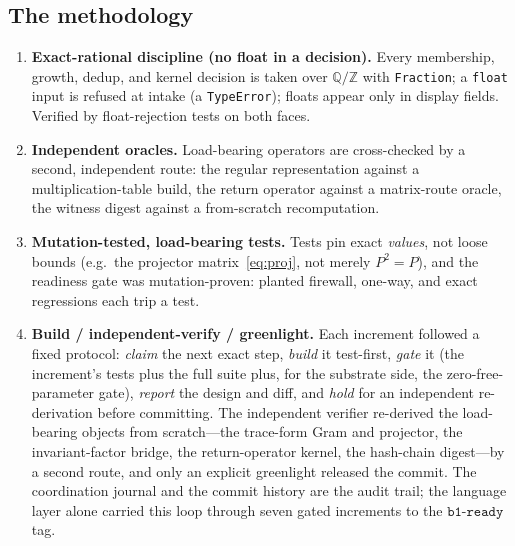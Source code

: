 \documentclass[11pt]{article}
\theoremstyle{plain}
\theoremstyle{definition}
\theoremstyle{remark}
\newcommand{\Q}{\mathbb{Q}}
\newcommand{\Z}{\mathbb{Z}}
\begin{document}
\subsection{The methodology}
\begin{enumerate}[label=(M\arabic*),leftmargin=*]
  \item \textbf{Exact-rational discipline (no float in a decision).} Every membership, growth, dedup, and
        kernel decision is taken over $\Q/\Z$ with \texttt{Fraction}; a \texttt{float} input is refused at
        intake (a \texttt{TypeError}); floats appear only in display fields. Verified by float-rejection tests
        on both faces.
  \item \textbf{Independent oracles.} Load-bearing operators are cross-checked by a second, independent route:
        the regular representation against a multiplication-table build, the return operator against a
        matrix-route oracle, the witness digest against a from-scratch recomputation.
  \item \textbf{Mutation-tested, load-bearing tests.} Tests pin exact \emph{values}, not loose bounds (e.g.\
        the projector matrix~\eqref{eq:proj}, not merely $P^2=P$), and the readiness gate was mutation-proven:
        planted firewall, one-way, and exact regressions each trip a test.
  \item \textbf{Build / independent-verify / greenlight.} Each increment followed a fixed protocol:
        \emph{claim} the next exact step, \emph{build} it test-first, \emph{gate} it (the increment's tests
        plus the full suite plus, for the substrate side, the zero-free-parameter gate), \emph{report} the
        design and diff, and \emph{hold} for an independent re-derivation before committing. The independent
        verifier re-derived the load-bearing objects from scratch---the trace-form Gram and projector, the
        invariant-factor bridge, the return-operator kernel, the hash-chain digest---by a second route, and
        only an explicit greenlight released the commit. The coordination journal and the commit history are
        the audit trail; the language layer alone carried this loop through seven gated increments to the
        $\texttt{b1-ready}$ tag.
\end{enumerate}
\end{document}
